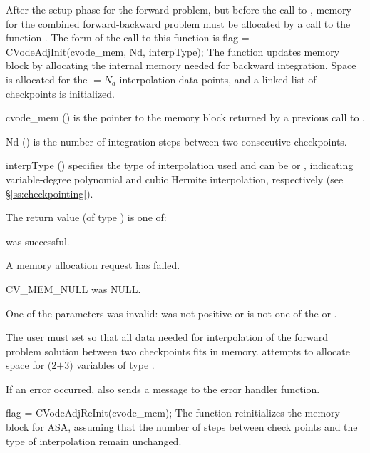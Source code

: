 After the setup phase for the forward problem, but before the call
to , memory for the combined forward-backward problem must be
allocated by a call to the function .
The form of the call to this function is
{
  flag = CVodeAdjInit(cvode\_mem, Nd, interpType);
}
{
  The function  updates {\cvodes} memory block by allocating
  the internal memory needed for backward integration.
  Space is allocated for the  $= N_d$ interpolation data points, and a linked
  list of checkpoints is initialized.
}
{
  \begin{args}[interpType]
  \item[cvode\_mem] ()
    is the pointer to the {\cvodes} memory block returned by a previous call to
    .
  \item[Nd] ()
    is the number of integration steps between two consecutive checkpoints.
  \item[interpType] ()
    specifies the type of interpolation used and can be 
    or , indicating variable-degree polynomial and cubic Hermite
    interpolation, respectively (see \S\ref{ss:checkpointing}).
  \end{args}
}
{
   The return value  (of type ) is one of:
   \begin{args}
   \item[\Id{CV\_SUCCESS}]
      was successful.
   \item[\Id{CV\_MEM\_FAIL}]
     A memory allocation request has failed.
   \item[CV\_MEM\_NULL]
      was NULL.
   \item[\Id{CV\_ILL\_INPUT}]
     One of the parameters was invalid:  was not positive or 
     is not one of the  or .
   \end{args}
}
{
  The user must set  so that all data needed for interpolation of the
  forward problem solution between two checkpoints fits in memory. 
  attempts to allocate space for $(2$$+3)$ variables of type .

  If an error occurred,  also sends a message to the
  error handler function.
}
{
  flag = CVodeAdjReInit(cvode\_mem);
}
{
  The function  reinitializes the {\cvodes} memory
  block for ASA, assuming that the number of steps between check
  points and the type of interpolation remain unchanged.
}
